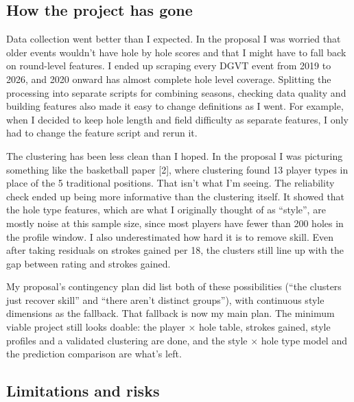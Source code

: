 \documentclass[10pt]{article}
\begin{document}
\subsection{How the project has gone}

Data collection went better than I expected. In the proposal I was worried that older events wouldn't have hole by hole scores and that I might have to fall back on round-level features. I ended up scraping every DGVT event from 2019 to 2026, and 2020 onward has almost complete hole level coverage. Splitting the processing into separate scripts for combining seasons, checking data quality and building features also made it easy to change definitions as I went. For example, when I decided to keep hole length and field difficulty as separate features, I only had to change the feature script and rerun it.

The clustering has been less clean than I hoped. In the proposal I was picturing something like the basketball paper [2], where clustering found 13 player types in place of the 5 traditional positions. That isn't what I'm seeing. The reliability check ended up being more informative than the clustering itself. It showed that the hole type features, which are what I originally thought of as ``style'', are mostly noise at this sample size, since most players have fewer than 200 holes in the profile window. I also underestimated how hard it is to remove skill. Even after taking residuals on strokes gained per 18, the clusters still line up with the gap between rating and strokes gained.

My proposal's contingency plan did list both of these possibilities (``the clusters just recover skill'' and ``there aren't distinct groups''), with continuous style dimensions as the fallback. That fallback is now my main plan. The minimum viable project still looks doable: the player $\times$ hole table, strokes gained, style profiles and a validated clustering are done, and the style $\times$ hole type model and the prediction comparison are what's left.

\subsection{Limitations and risks}
\end{document}
